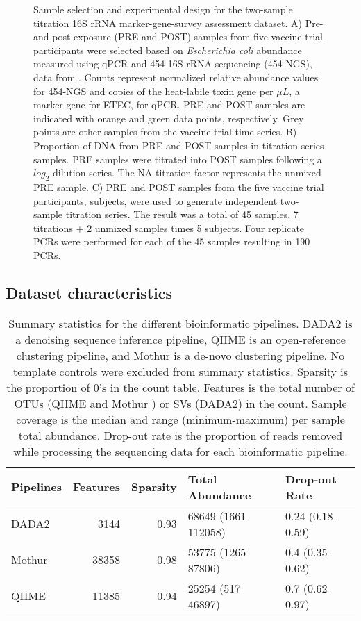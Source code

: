 \documentclass{bmcart}
\def\texttt{[image: ]}
\begin{document}
\begin{figure}
\centering
\texttt{[image: img/experimentalDesign.png]}
\caption{\label{fig:countExperimentalDesign}Sample selection and
experimental design for the two-sample titration 16S rRNA
marker-gene-survey assessment dataset. A) Pre- and post-exposure (PRE
and POST) samples from five vaccine trial participants were selected
based on \textit{Escherichia coli} abundance measured using qPCR and 454
16S rRNA sequencing (454-NGS), data from \cite{pop2016individual}.
Counts represent normalized relative abundance values for 454-NGS and
copies of the heat-labile toxin gene per \(\mu L\), a marker gene for
ETEC, for qPCR. PRE and POST samples are indicated with orange and green
data points, respectively. Grey points are other samples from the
vaccine trial time series. B) Proportion of DNA from PRE and POST
samples in titration series samples. PRE samples were titrated into POST
samples following a \(log_2\) dilution series. The NA titration factor
represents the unmixed PRE sample. C) PRE and POST samples from the five
vaccine trial participants, subjects, were used to generate independent
two-sample titration series. The result was a total of 45 samples, 7
titrations + 2 unmixed samples times 5 subjects. Four replicate PCRs
were performed for each of the 45 samples resulting in 190 PCRs.}
\end{figure}


\subsection*{Dataset characteristics}

\begin{table}

\caption{\label{tab:pipeQA}Summary statistics for the different bioinformatic pipelines. DADA2 is a denoising sequence inference pipeline, QIIME is an open-reference clustering pipeline, and Mothur  is a de-novo clustering pipeline. No template controls were excluded from summary statistics. Sparsity is the proportion of 0's in the count table. Features is the total number of OTUs (QIIME and Mothur ) or SVs (DADA2) in the count. Sample coverage is the median and range (minimum-maximum) per sample total abundance. Drop-out rate is the proportion of reads removed while processing the sequencing data for each bioinformatic pipeline.}
\centering
\begin{tabular}[t]{lrrll}
\toprule
Pipelines & Features & Sparsity & Total Abundance & Drop-out Rate\\
\midrule
DADA2 & 3144 & 0.93 & 68649 (1661-112058) & 0.24 (0.18-0.59)\\
Mothur & 38358 & 0.98 & 53775 (1265-87806) & 0.4 (0.35-0.62)\\
QIIME & 11385 & 0.94 & 25254 (517-46897) & 0.7 (0.62-0.97)\\
\bottomrule
\end{tabular}
\end{table}
\end{document}
